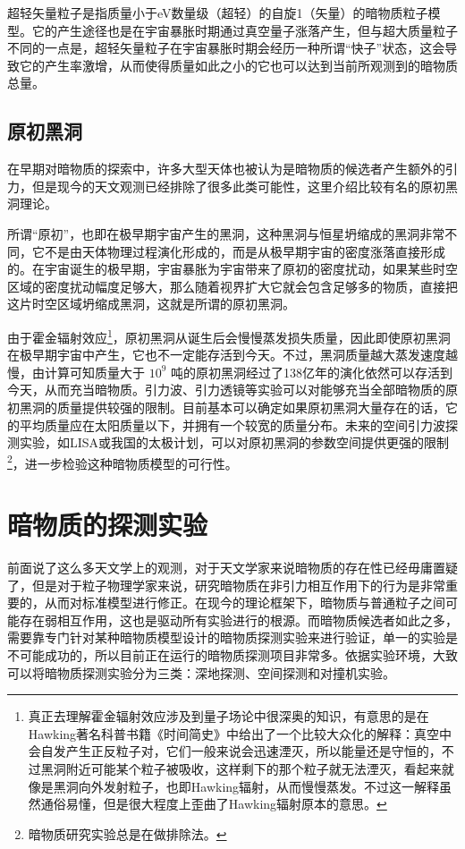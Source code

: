 \documentclass{ctexart}
\begin{document}
	超轻矢量粒子是指质量小于eV数量级（超轻）的自旋1（矢量）的暗物质粒子模型。它的产生途径也是在宇宙暴胀时期通过真空量子涨落产生，但与超大质量粒子不同的一点是，超轻矢量粒子在宇宙暴胀时期会经历一种所谓“快子”状态，这会导致它的产生率激增，从而使得质量如此之小的它也可以达到当前所观测到的暗物质总量。
	\subsection{原初黑洞}
	在早期对暗物质的探索中，许多大型天体也被认为是暗物质的候选者产生额外的引力，但是现今的天文观测已经排除了很多此类可能性，这里介绍比较有名的原初黑洞理论。
	
	所谓“原初”，也即在极早期宇宙产生的黑洞，这种黑洞与恒星坍缩成的黑洞非常不同，它不是由天体物理过程演化形成的，而是从极早期宇宙的密度涨落直接形成的。在宇宙诞生的极早期，宇宙暴胀为宇宙带来了原初的密度扰动，如果某些时空区域的密度扰动幅度足够大，那么随着视界扩大它就会包含足够多的物质，直接把这片时空区域坍缩成黑洞，这就是所谓的原初黑洞。
	
	由于霍金辐射效应\footnote{真正去理解霍金辐射效应涉及到量子场论中很深奥的知识，有意思的是在Hawking著名科普书籍《时间简史》中给出了一个比较大众化的解释：真空中会自发产生正反粒子对，它们一般来说会迅速湮灭，所以能量还是守恒的，不过黑洞附近可能某个粒子被吸收，这样剩下的那个粒子就无法湮灭，看起来就像是黑洞向外发射粒子，也即Hawking辐射，从而慢慢蒸发。不过这一解释虽然通俗易懂，但是很大程度上歪曲了Hawking辐射原本的意思。}，原初黑洞从诞生后会慢慢蒸发损失质量，因此即使原初黑洞在极早期宇宙中产生，它也不一定能存活到今天。不过，黑洞质量越大蒸发速度越慢，由计算可知质量大于 $10^9$ 吨的原初黑洞经过了138亿年的演化依然可以存活到今天，从而充当暗物质。引力波、引力透镜等实验可以对能够充当全部暗物质的原初黑洞的质量提供较强的限制。目前基本可以确定如果原初黑洞大量存在的话，它的平均质量应在太阳质量以下，并拥有一个较宽的质量分布。未来的空间引力波探测实验，如LISA或我国的太极计划，可以对原初黑洞的参数空间提供更强的限制\footnote{暗物质研究实验总是在做排除法。}，进一步检验这种暗物质模型的可行性。
	\section{暗物质的探测实验}
	前面说了这么多天文学上的观测，对于天文学家来说暗物质的存在性已经毋庸置疑了，但是对于粒子物理学家来说，研究暗物质在非引力相互作用下的行为是非常重要的，从而对标准模型进行修正。在现今的理论框架下，暗物质与普通粒子之间可能存在弱相互作用，这也是驱动所有实验进行的根源。而暗物质候选者如此之多，需要靠专门针对某种暗物质模型设计的暗物质探测实验来进行验证，单一的实验是不可能成功的，所以目前正在运行的暗物质探测项目非常多。依据实验环境，大致可以将暗物质探测实验分为三类：深地探测、空间探测和对撞机实验。
	
\end{document}
